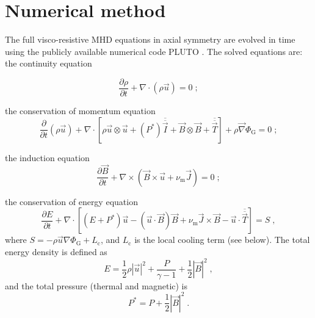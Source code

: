 \documentclass{aa}
\begin{document}
\section{Numerical method}
\label{NumericalMethod}

The full visco-resistive MHD equations in axial symmetry are evolved in time using the publicly available numerical code PLUTO \citep{2007ApJS..170..228M}.  
The solved equations are: the continuity equation

\begin{equation}
\frac{\partial \rho}{\partial t}+\nabla\cdot(\rho \vec u)=0 \; ;
\end{equation}

the conservation of momentum equation
\begin{equation}
\frac{\partial}{\partial t}\left( \rho \vec u \right) +\nabla \cdot \left[ \rho \vec u \otimes \vec u +\left( P^* \right) {\overline {\overline{\vec I} }} +\vec{B} \otimes \vec{B} +
{\overline {\overline{\vec T}}} \right] + \rho \vec \nabla \Phi_\mathrm{G} =0 \; ;
\end{equation}

the induction equation
\begin{equation}
\frac{\partial \vec{B} }{\partial t}+ \nabla \times ( \vec{B} \times \vec{u} + \nu_\mathrm{m} \vec{J} ) = 0 \; ;
\end{equation}

the conservation of energy equation
\begin{equation}
\frac{\partial E}{\partial t} +\nabla \cdot \left[ \left( E + P^*\right) \vec{u} - (\vec{u}\cdot\vec{B})\vec{B} + \nu_\mathrm{m} \vec{J} \times \vec{B} - \vec{u} \cdot {\overline
{\overline{\vec T}}} \right] = S \; ,
\end{equation}
where $S=-\rho\vec{u} \nabla \Phi_\mathrm{G} + L_\mathrm{c}$, and $L_\mathrm{c}$ is the local cooling term (see below). The total energy density is defined as
\begin{equation}
E = \frac{1}{2}\rho |\vec{u}|^2 + \frac{P}{\gamma-1}+ \frac{1}{2} |\vec{B}|^2 \; ,
\end{equation}
and the total pressure (thermal and magnetic) is
\begin{equation}
P^* = P + \frac{1}{2}|\vec{B}|^2 \; .
\end{equation}
\end{document}
